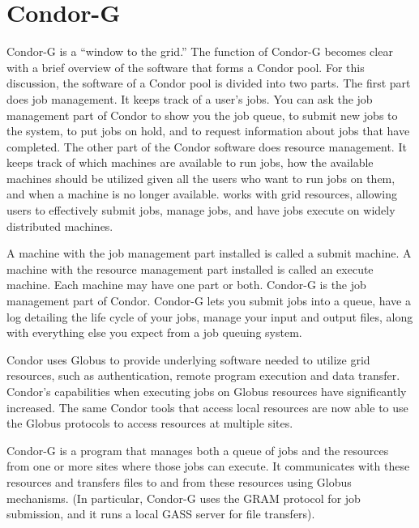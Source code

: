 
\section{\label{sec:Condor-G}Condor-G}

Condor-G is a ``window to the grid.''
The function of Condor-G becomes clear
with a brief overview of the software that forms a Condor pool.
For this discussion, the software of a Condor pool is divided
into two parts.
The first part does job management.
It keeps track of a user's jobs.
You can ask the job management part of Condor to show
you the job queue, to submit new jobs to the system,
to put jobs on hold,
and to request information about jobs that have completed.
The other part of the Condor software
does resource management.
It keeps track of which machines are available to run jobs,
how the available machines should be utilized given all the users
who want to run jobs on them,
and when a machine is no longer available.
works with grid resources, allowing users to
effectively submit jobs, manage jobs, and have jobs execute
on widely distributed machines.

A machine with the job management part installed
is called a submit machine.
A machine with the resource management part installed 
is called an execute machine.
Each machine may have one part or both.
Condor-G is the job management part of Condor.
Condor-G lets you submit jobs into a queue,
have a log detailing the life cycle of your jobs,
manage your input and output files,
along with everything else you expect from a job queuing system.

Condor uses 
Globus to provide underlying software needed to utilize
grid resources, such as authentication, remote program
execution and data transfer.
Condor's capabilities when executing jobs on Globus resources have
significantly increased.
The same Condor tools that access local resources 
are now able to use the Globus protocols to access resources at multiple
sites. 

Condor-G is a program that manages both a queue of jobs
and the resources from one or more sites where those jobs can execute. 
It communicates with these resources and transfers files
to and from these resources using Globus mechanisms.
(In particular, Condor-G uses the GRAM protocol for job submission,
and it runs a local GASS server for file transfers).


